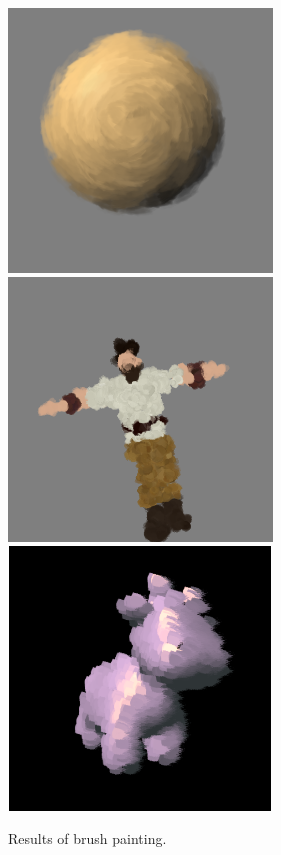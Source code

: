 \begin{figure}
    \begin{center}
    \includegraphics[width=70mm, height=70mm]{Resultats/painting1/final.png}
    \includegraphics[width=70mm, height=70mm]{Resultats/paintChar/final.png}
    \includegraphics[width=70mm, height=70mm]{Resultats/spotPaint.png}
    \end{center}
    \caption{Results of brush painting.}
    \label{results_paint}
\end{figure}

